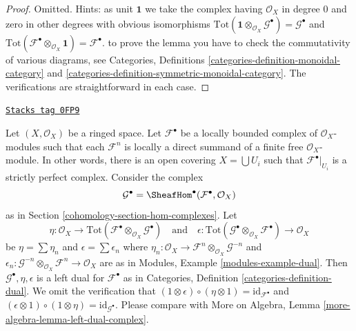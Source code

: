 \begin{proof}
Omitted. Hints: as unit $\mathbf{1}$ we take the complex having
$\mathcal{O}_X$ in degree $0$ and zero in other degrees with
obvious isomorphisms
$\text{Tot}(\mathbf{1} \otimes_{\mathcal{O}_X} \mathcal{G}^\bullet) =
\mathcal{G}^\bullet$ and
$\text{Tot}(\mathcal{F}^\bullet \otimes_{\mathcal{O}_X} \mathbf{1}) =
\mathcal{F}^\bullet$.
to prove the lemma you have to check the commutativity
of various diagrams, see Categories, Definitions
\ref{categories-definition-monoidal-category} and
\ref{categories-definition-symmetric-monoidal-category}.
The verifications are straightforward in each case.
\end{proof}

\begin{example}[Dual]
\label{cohomology-example-dual}
\href{https://stacks.math.columbia.edu/tag/0FP9}{\texttt{Stacks tag 0FP9}}

Let $(X, \mathcal{O}_X)$ be a ringed space. Let $\mathcal{F}^\bullet$
be a locally bounded complex of $\mathcal{O}_X$-modules such that each
$\mathcal{F}^n$ is locally a direct summand of a finite
free $\mathcal{O}_X$-module. In other words, there is an open covering
$X = \bigcup U_i$ such that $\mathcal{F}^\bullet|_{U_i}$ is a strictly
perfect complex. Consider the complex
$$
\mathcal{G}^\bullet = \SheafHom^\bullet(\mathcal{F}^\bullet, \mathcal{O}_X)
$$
as in Section \ref{cohomology-section-hom-complexes}. Let
$$
\eta :
\mathcal{O}_X
\to
\text{Tot}(\mathcal{F}^\bullet \otimes_{\mathcal{O}_X} \mathcal{G}^\bullet)
\quad\text{and}\quad
\epsilon :
\text{Tot}(\mathcal{G}^\bullet \otimes_{\mathcal{O}_X} \mathcal{F}^\bullet)
\to
\mathcal{O}_X
$$
be $\eta = \sum \eta_n$ and $\epsilon = \sum \epsilon_n$
where $\eta_n : \mathcal{O}_X \to
\mathcal{F}^n \otimes_{\mathcal{O}_X} \mathcal{G}^{-n}$
and
$\epsilon_n : \mathcal{G}^{-n} \otimes_{\mathcal{O}_X} \mathcal{F}^n
\to \mathcal{O}_X$ are as in Modules, Example \ref{modules-example-dual}.
Then $\mathcal{G}^\bullet, \eta, \epsilon$
is a left dual for $\mathcal{F}^\bullet$ as in
Categories, Definition \ref{categories-definition-dual}.
We omit the verification that
$(1 \otimes \epsilon) \circ (\eta \otimes 1) = \text{id}_{\mathcal{F}^\bullet}$
and
$(\epsilon \otimes 1) \circ (1 \otimes \eta) =
\text{id}_{\mathcal{G}^\bullet}$. Please compare with
More on Algebra, Lemma \ref{more-algebra-lemma-left-dual-complex}.
\end{example}

